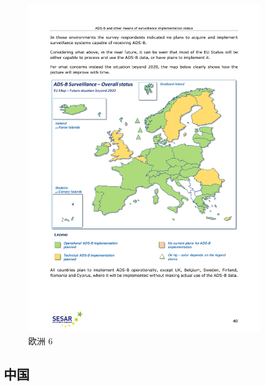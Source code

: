 \begin{figure}[htbp]
\centering
\includegraphics[width=10cm]{pic/20180515-sesar-ads-b-report_40.pdf}
\caption{欧洲 6}
\label{fig:20180515-sesar-ads-b-report_40}
\end{figure}

\subsection{中国}

